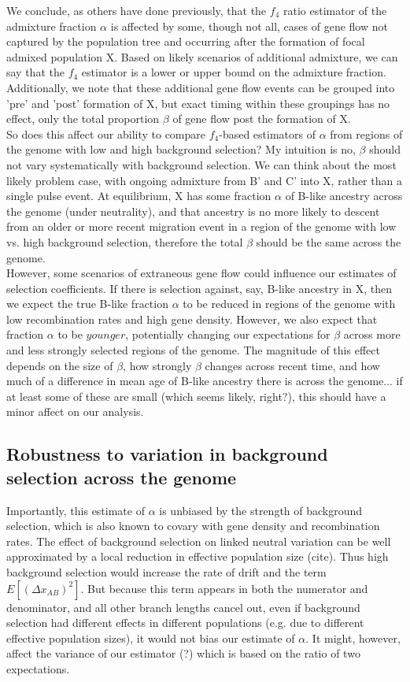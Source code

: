 \documentclass[12pt]{report}
\begin{document}
We conclude, as others have done previously, that the $f_4$ ratio estimator of the admixture fraction $\alpha$ is affected by some, though not all, cases of gene flow not captured by the population tree and occurring after the formation of focal admixed population X. Based on likely scenarios of additional admixture, we can say that the $f_4$ estimator is a lower or upper bound on the admixture fraction. Additionally, we note that these additional gene flow events can be grouped into 'pre' and 'post' formation of X, but exact timing within these groupings has no effect, only the total proportion $\beta$ of gene flow post the formation of X. \\
So does this affect our ability to compare $f_4$-based estimators of $\alpha$ from regions of the genome with low and high background selection? My intuition is no, $\beta$ should not vary systematically with background selection. We can think about the most likely problem case, with ongoing admixture from B' and C' into X, rather than a single pulse event. At equilibrium, X has some fraction $\alpha$ of B-like ancestry across the genome (under neutrality), and that ancestry is no more likely to descent from an older or more recent migration event in a region of the genome with low vs. high background selection, therefore the total $\beta$ should be the same across the genome. \\
However, some scenarios of extraneous gene flow could influence our estimates of selection coefficients. If there is selection against, say, B-like ancestry in X, then we expect the true B-like fraction $\alpha$ to be reduced in regions of the genome with low recombination rates and high gene density. However, we also expect that fraction $\alpha$ to be $younger$, potentially changing our expectations for $\beta$ across more and less strongly selected regions of the genome. The magnitude of this effect depends on the size of $\beta$, how strongly $\beta$ changes across recent time, and how much of a difference in mean age of B-like ancestry there is across the genome... if at least some of these are small (which seems likely, right?), this should have a minor affect on our analysis.\\


\subsection{Robustness to variation in background selection across the genome}
Importantly, this estimate of $\alpha$ is unbiased by the strength of background selection, which is also known to covary with gene density and recombination rates. The effect of background selection on linked neutral variation can be well approximated by a local reduction in effective population size (cite). Thus high background selection would increase the rate of drift and the term $E[(\Delta{x_{AB}})^2]$. But because this term appears in both the numerator and denominator, and all other branch lengths cancel out, even if background selection had different effects in different populations (e.g. due to different effective population sizes), it would not bias our estimate of $\alpha$. It might, however, affect the variance of our estimator (?) which is based on the ratio of two expectations.
\end{document}
